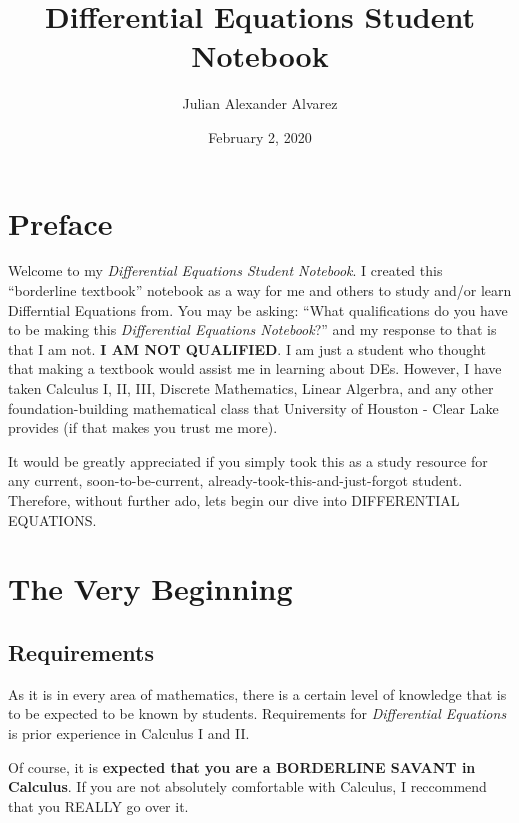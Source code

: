 \documentclass[letter, 11pt]{book}
\begin{document}
\title{\Large{\textbf{Differential Equations Student Notebook}}}
\author{Julian Alexander Alvarez}
\date{February 2, 2020}
\maketitle
\let\cleardoublepage\clearpage
\tableofcontents

\setcounter{page}{2}
\fancyhf{}
\renewcommand{\headrulewidth}{2pt}
\renewcommand{\footrulewidth}{1pt}

\fancyhead[LE]{\leftmark}
\fancyhead[RO]{\leftmark}
\fancyfoot[LE,RO]{\thepage}


\chapter{Preface}
Welcome to my \textit{Differential Equations Student Notebook}. I created this ``borderline textbook'' notebook
as a way for me and others to study and/or learn Differntial Equations from. You may be asking: ``What qualifications do you have to be making this \textit{Differential Equations Notebook}?''
and my response to that is that I am not. \textbf{I AM NOT QUALIFIED}. I am just a student who thought that making a textbook would assist me in learning about DEs. However, I have taken Calculus I, II, III, Discrete Mathematics, Linear Algerbra, and any other foundation-building mathematical class that University of Houston - Clear Lake provides (if that makes you trust me more).


It would be greatly appreciated if you simply took this as a study resource for any current, soon-to-be-current, already-took-this-and-just-forgot student.
Therefore, without further ado, lets begin our dive into DIFFERENTIAL EQUATIONS.
\newpage
\chapter{The Very Beginning}
\section{Requirements}
As it is in every area of mathematics, there is a certain level of knowledge that is to be expected to be known by students.
Requirements for \textit{Differential Equations} is prior experience in Calculus I and II.

Of course, it is \textbf{expected that you are a BORDERLINE SAVANT in Calculus}. If you are not absolutely comfortable with Calculus, I reccommend that you REALLY go over it.
\end{document}
